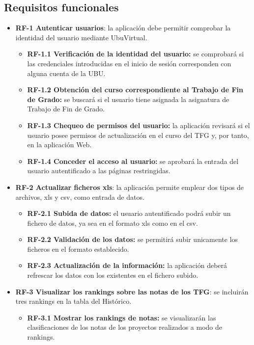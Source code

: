 \subsection{Requisitos funcionales}
\begin{itemize}
	
	\item \textbf{RF-1 Autenticar usuarios}: la aplicación debe permitir comprobar la identidad del usuario mediante UbuVirtual.
	\begin{itemize}
		\item \textbf{RF-1.1 Verificación de la identidad del usuario:} se comprobará si las credenciales introducidas en el inicio de sesión corresponden con alguna cuenta de la UBU.
		\item \textbf{RF-1.2 Obtención del curso correspondiente al Trabajo de Fin de Grado:} se buscará si el usuario tiene asignada la asignatura de Trabajo de Fin de Grado.
		\item \textbf{RF-1.3 Chequeo de permisos del usuario:} la aplicación revisará si el usuario posee permisos de actualización en el curso del TFG y, por tanto, en la aplicación Web.
		\item \textbf{RF-1.4 Conceder el acceso al usuario:} se aprobará la entrada del usuario autentificado a las páginas restringidas.
	\end{itemize}

	\item \textbf{RF-2 Actualizar ficheros xls}: la aplicación permite emplear dos tipos de archivos, xls y csv, como entrada de datos.
	\begin{itemize}
		\item \textbf{RF-2.1 Subida de datos:} el usuario autentificado podrá subir un fichero de datos, ya sea en el formato xls como en el csv. 
		\item \textbf{RF-2.2 Validación de los datos:} se permitirá subir unicamente los ficheros en el formato establecido.
		\item \textbf{RF-2.3 Actualización de la información:} la aplicación deberá refrescar los datos con los existentes en el fichero subido.
	\end{itemize}

	\item \textbf{RF-3 Visualizar los rankings sobre las notas de los TFG}: se incluirán tres rankings en la tabla del Histórico.
	\begin{itemize}
		\item \textbf{RF-3.1 Mostrar los rankings de notas:} se visualizarán las clasificaciones de los notas de los proyectos realizados a modo de rankings.
	\end{itemize}
		
\end{itemize}

